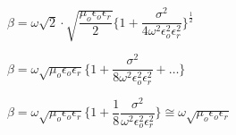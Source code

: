 \begin{center}
$\beta = \omega\sqrt{2}\cdot\sqrt{\dfrac{\mu_{o}\epsilon_{o}\epsilon_{r}}{2}}\Bigg\{1 + \dfrac{\sigma^{2}}{4\omega^{2}\epsilon_{o}^{2}\epsilon_{r}^{2}}\Bigg\}^{\frac{1}{2}}$
\end{center}

\begin{center}
$\beta = \omega\sqrt{\mu_{o}\epsilon_{o}\epsilon_{r}}\Bigg\{1 + \dfrac{\sigma^{2}}{8\omega^{2}\epsilon_{o}^{2}\epsilon_{r}^{2}} + \dots\Bigg\}$
\end{center}


\begin{center}
$\beta = \omega\sqrt{\mu_{o}\epsilon_{o}\epsilon_{r}}\Bigg\{1 + \dfrac{1}{8} \dfrac{\sigma^{2}}{\omega^{2}\epsilon_{o}^{2}\epsilon_{r}^{2}}\Bigg\} \cong \omega\sqrt{\mu_{o}\epsilon_{o}\epsilon_{r}}$
\end{center}

